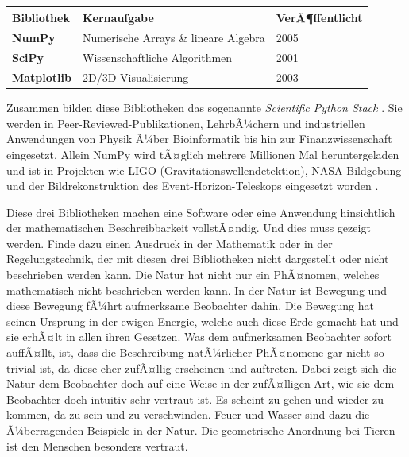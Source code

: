 \documentclass[12pt, a4paper]{article}
\begin{document}
\begin{center}
\begin{tabular}{lll}
  \toprule
  \textbf{Bibliothek} & \textbf{Kernaufgabe} & \textbf{VerÃ¶ffentlicht} \\
  \midrule
  \textcolor{numpyblue}{\textbf{NumPy}} & Numerische Arrays \& lineare Algebra & 2005 \\
  \textcolor{scipygreen}{\textbf{SciPy}} & Wissenschaftliche Algorithmen & 2001 \\
  \textcolor{mplred}{\textbf{Matplotlib}} & 2D/3D-Visualisierung & 2003 \\
  \bottomrule
\end{tabular}
\end{center}

\vspace{0.5em}
Zusammen bilden diese Bibliotheken das sogenannte \emph{Scientific Python
Stack} \cite{virtanen2020scipy, harris2020array, hunter2007matplotlib}.
Sie werden in Peer-Reviewed-Publikationen, LehrbÃ¼chern und industriellen
Anwendungen von Physik Ã¼ber Bioinformatik bis hin zur Finanzwissenschaft
eingesetzt. Allein NumPy wird tÃ¤glich mehrere Millionen Mal heruntergeladen
und ist in Projekten wie LIGO (Gravitationswellendetektion), NASA-Bildgebung
und der Bildrekonstruktion des Event-Horizon-Teleskops eingesetzt worden
\cite{harris2020array}.

Diese drei Bibliotheken machen eine Software oder eine Anwendung hinsichtlich der mathematischen Beschreibbarkeit vollstÃ¤ndig. Und dies muss gezeigt werden. Finde dazu einen Ausdruck in der Mathematik oder in der Regelungstechnik, der mit diesen drei Bibliotheken nicht dargestellt oder nicht beschrieben werden kann. Die Natur hat nicht nur ein PhÃ¤nomen, welches mathematisch nicht beschrieben werden kann. In der Natur ist Bewegung und diese Bewegung fÃ¼hrt aufmerksame Beobachter dahin. Die Bewegung hat seinen Ursprung in der ewigen Energie, welche auch diese Erde gemacht hat und sie erhÃ¤lt in allen ihren Gesetzen. Was dem aufmerksamen Beobachter sofort auffÃ¤llt, ist, dass die Beschreibung natÃ¼rlicher PhÃ¤nomene gar nicht so trivial ist, da diese eher zufÃ¤llig erscheinen und auftreten. Dabei zeigt sich die Natur dem Beobachter doch auf eine Weise in der zufÃ¤lligen Art, wie sie dem Beobachter doch intuitiv sehr vertraut ist. Es scheint zu gehen und wieder zu kommen, da zu sein und zu verschwinden. Feuer und Wasser sind dazu die Ã¼berragenden Beispiele in der Natur. Die geometrische Anordnung bei Tieren ist den Menschen besonders vertraut.
\end{document}
